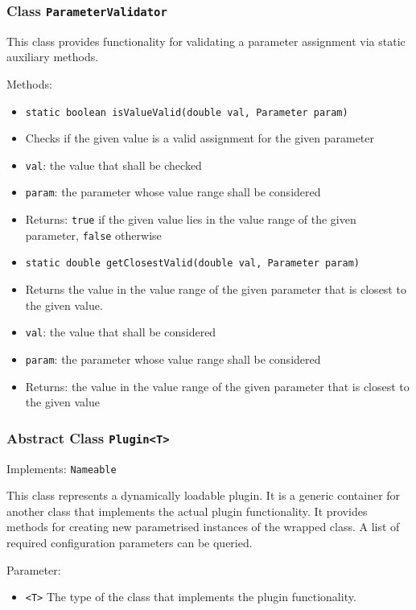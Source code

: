 \documentclass[parskip=full,11pt]{scrartcl}
\begin{document}
\subsubsection{Class \texttt{ParameterValidator}}

This class provides functionality for validating a parameter assignment via static auxiliary methods.

Methods:

\begin{itemize} \itemsep -10pt
	\item \texttt{static boolean isValueValid(double val, Parameter param)}
	\item[] Checks if the given value is a valid assignment for the given parameter
	\item[] \texttt{val}: the value that shall be checked
	\item[] \texttt{param}: the parameter whose value range shall be considered
	\item[] Returns: \texttt{true} if the given value lies in the value range of the given parameter, \texttt{false} otherwise
	\item \texttt{static double getClosestValid(double val, Parameter param)}
	\item[] Returns the value in the value range of the given parameter that is closest to the given value.
	\item[] \texttt{val}: the value that shall be considered
	\item[] \texttt{param}: the parameter whose value range shall be considered
	\item[] Returns: the value in the value range of the given parameter that is closest to the given value
\end{itemize}

\subsubsection{Abstract Class \texttt{Plugin<T>}}
Implements: \texttt{Nameable}

This class represents a dynamically loadable plugin. It is a generic container for another class that implements the actual plugin functionality. It provides methods for creating new parametrised instances of the wrapped class. A list of required configuration parameters can be queried.

Parameter:
\begin{itemize}\itemsep -10pt
	\item \texttt{<T>} The type of the class that implements the plugin functionality.
\end{itemize}
\end{document}
